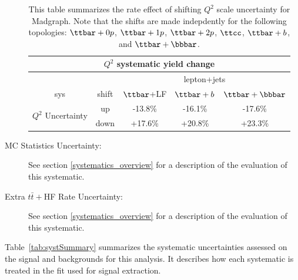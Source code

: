 \begin{description}
\begin{table}[hbtp] \small
   \centering 
    \begin{tabular}{|c|c|c|c|c|} \hline 
 \multicolumn{5}{|c|}{$Q^2$ systematic yield change} \\ \hline
 \multicolumn{2}{|c}{ } & \multicolumn{3}{|c|}{lepton+jets} \\ \hline
 sys & shift & $\ttbar$+LF & $\ttbar + b$ & $\ttbar + \bbbar$ \\ \hline 
 \multirow{2}{*}{$Q^2$ Uncertainty} & up   & -13.8\% & -16.1\% & -17.6\% \\
                                    & down & +17.6\% & +20.8\% & +23.3\% \\ 
 \hline
   \end{tabular} 
   \caption{This table summarizes the rate effect of shifting $Q^2$ scale uncertainty for Madgraph.  Note that the shifts are made indepdently for the following topologies: $\ttbar + 0p$, $\ttbar + 1p$, $\ttbar+2p$, $\ttcc$, $\ttbar+b$, and $\ttbar+\bbbar$.}
   \label{tab:Q2Rates}
 \end{table} 

 \item[MC Statistics Uncertainty:] See section \ref{systematics_overview}
  for a description of the evaluation of this systematic.

 \item[Extra $t\bar{t}+$HF Rate Uncertainty:] See section \ref{systematics_overview}
  for a description of the evaluation of this systematic.

\end{description}


\par Table~\ref{tab:systSummary} summarizes the systematic uncertainties
assessed on the signal and backgrounds for this analysis. It describes
how each systematic is treated in the fit used for signal extraction.

